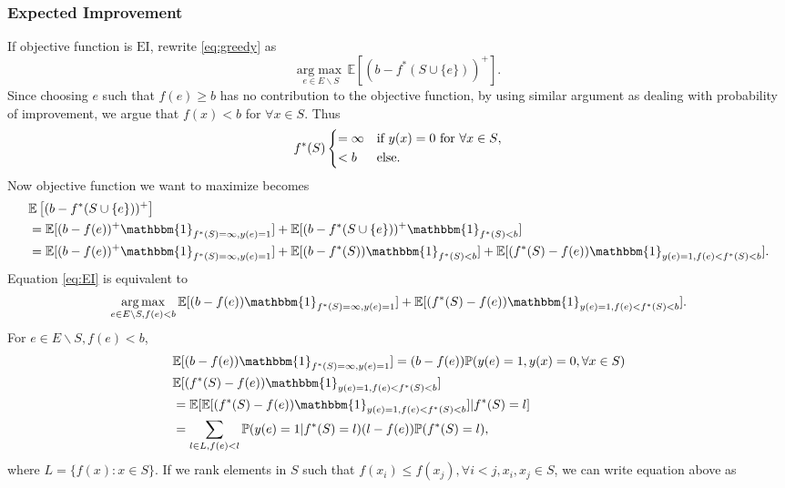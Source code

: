 \documentclass[12pt]{article}
\newcommand{\E}{\mathbb{E}}
\newcommand{\EI}{\mathrm{EI}}
\begin{document}
\subsubsection{Expected Improvement}
If objective function is $\EI$, rewrite \eqref{eq:greedy} as 
\begin{equation} \label{eq:EI}
\underset{e \in E \backslash S}{\mathrm{arg}\max} \, \E \left[ (b-f^*(S \cup \{e\}))^+ \right].
\end{equation}
Since choosing $e$ such that $f(e) \geq b$ has no contribution to the objective function, by using similar argument as dealing with probability of improvement, we argue that $f(x)<b$ for $\forall x \in S$. Thus
\begin{equation*}
f^*(S)  \begin{dcases}
         =\infty & \text{if $y(x)=0$ for $\forall x \in S$},\\
         < b & \text{else}.
 \end{dcases}
\end{equation*}
Now objective function we want to maximize becomes
\begin{align*}
&\E \left[ (b-f^*(S \cup \{e\}))^+ \right] \\
&= \E[(b-f(e))^+ \mathbbm{1}_{f^*(S)=\infty, y(e)=1}]+ \E[ (b-f^*(S \cup \{e\}))^+ \mathbbm{1}_{f^*(S)<b}] \\
&= \E[(b-f(e))^+ \mathbbm{1}_{f^*(S)=\infty, y(e)=1}]+ \E[ (b-f^*(S)) \mathbbm{1}_{f^*(S)<b}] + \E[(f^*(S)-f(e)) \mathbbm{1}_{y(e)=1, f(e)<f^*(S)<b}].
\end{align*}
Equation \eqref{eq:EI} is equivalent to 
\begin{equation} \label{eq:EI2}
\underset{e \in E \backslash S, f(e)<b}{\mathrm{arg}\max} \, \E[(b-f(e)) \mathbbm{1}_{f^*(S)=\infty, y(e)=1}]+\E[(f^*(S)-f(e)) \mathbbm{1}_{y(e)=1, f(e)<f^*(S)<b}].
\end{equation}
For $e \in E \backslash S, f(e)<b$,
\begin{align*}
&\E[(b-f(e)) \mathbbm{1}_{f^*(S)=\infty, y(e)=1}] = (b-f(e)) \mathbb{P}(y(e)=1, y(x)=0, \forall x \in S)\\
&\E[(f^*(S)-f(e)) \mathbbm{1}_{y(e)=1, f(e)<f^*(S)<b}]\\
&=\E[\E[(f^*(S)-f(e)) \mathbbm{1}_{y(e)=1, f(e)<f^*(S)<b}]|f^*(S)=l]\\
&= \sum_{l \in L, f(e)<l} \mathbb{P}(y(e)=1|f^*(S)=l)(l-f(e))\mathbb{P}(f^*(S)=l),\\
\end{align*}
where $L = \{f(x): x \in S\}$. If we rank elements in $S$ such that $f(x_i) \leq f(x_j), \forall i<j, x_i,x_j \in S$, we can write equation above as
\end{document}
